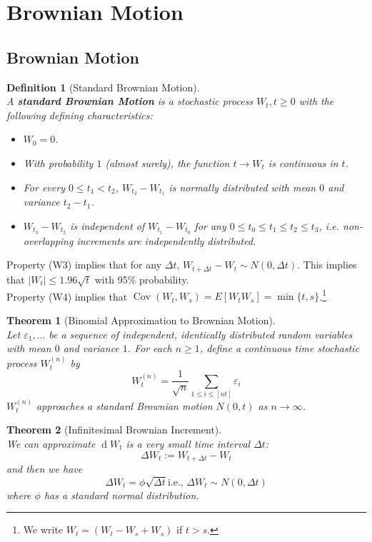 \documentclass[12pt]{article}
\newtheorem{definition}{Definition}[section]
\newtheorem{theorem}{Theorem}[section]
\theoremstyle{definition}
\DeclareMathOperator{\diff}{d}
\DeclareMathOperator{\cov}{Cov}
\begin{document}
\section{Brownian Motion}
\subsection{Brownian Motion}
\begin{definition}[Standard Brownian Motion]
\hfill\\\normalfont A \textbf{standard Brownian Motion} is a stochastic process $W_t, t\geq 0$ with the following defining characteristics:
\begin{itemize}
  \item[(W1)] $W_0=0$.
  \item[(W2)] With probability $1$ (almost surely), the function $t\to W_t$ is continuous in $t$.
  \item[(W3)] For every $0\leq t_1<t_2$, $W_{t_2}-W_{t_1}$ is normally distributed with mean $0$ and variance $t_2-t_1$.
  \item[(W4)] $W_{t_3}-W_{t_2}$ is independent of $W_{t_1}-W_{t_0}$ for any $0\leq t_0\leq t_1\leq t_2\leq t_3$, i.e. non-overlapping increments are independently distributed.
\end{itemize}
\end{definition}
Property (W3) implies that for any $\Delta t$, $W_{t+\Delta t}-W_t\sim N(0,\Delta t)$. This implies that $|W_t|\leq 1.96\sqrt{t}$ with 95\% probability.\\
Property (W4) implies that $\cov (W_t, W_s) = E[W_tW_s] = \min\{t,s\}$.\footnote{We write $W_t=(W_t-W_s+W_s)$ if $t>s$.}
\begin{theorem}[Binomial Approximation to Brownian Motion]
\hfill\\\normalfont Let $\varepsilon_1,\ldots$ be a sequence of independent, identically distributed random variables with mean $0$ and variance $1$. For each $n\geq 1$, define a continuous time stochastic process $W_t^{(n)}$ by
\[
W_t^{(n)} = \frac{1}{\sqrt{n}} \sum_{1\leq i\leq [nt]} \varepsilon_i
\]
$W_t^{(n)}$ approaches a standard Brownian motion $N(0,t)$ as $n\to \infty$.
\end{theorem}
\begin{theorem}[Infinitesimal Brownian Increment]
\hfill\\\normalfont We can approximate $\diff W_t$ is a very small time interval $\Delta t$:
\[
\Delta W_t:=W_{t+\Delta t} - W_t
\]
and then we have
\[
\Delta W_t = \phi \sqrt{\Delta t} \text{i.e., }\Delta W_t \sim N(0, \Delta t)
\]
where $\phi$ has a standard normal distribution.
\end{theorem}
\end{document}
